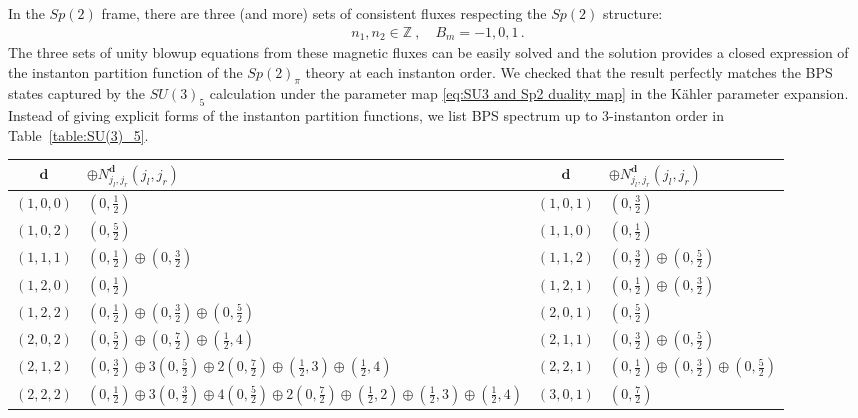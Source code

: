 In the $ Sp(2) $ frame, there are three (and more) sets of consistent fluxes respecting the $ Sp(2) $ structure:
\begin{align}
n_1,n_2 \in \mathbb{Z} \ , \quad B_m = -1, 0, 1 \, .
\end{align}
The three sets of unity blowup equations from these magnetic fluxes can be easily solved and the solution provides a closed expression of the instanton partition function of the $ Sp(2)_\pi $ theory at each instanton order. We checked that the result perfectly matches the BPS states captured by the $ SU(3)_5 $ calculation under the parameter map \eqref{eq:SU3 and Sp2 duality map} in the K\"ahler parameter expansion. Instead of giving explicit forms of  the instanton partition functions, we list BPS spectrum up to 3-instanton order in Table~\ref{table:SU(3)_5}.
\begin{table}
	\centering
	\begin{tabular}{|c|C{28ex}||c|C{28ex}|} \hline
		$ \mathbf{d} $ & $\oplus N_{j_l, j_r}^{\mathbf{d}} (j_l, j_r)$ & $ \mathbf{d} $ & $\oplus N_{j_l, j_r}^{\mathbf{d}} (j_l, j_r)$ \\ \hline
		$ (1, 0, 0) $ & $ (0, \frac{1}{2}) $ & $ (1, 0, 1) $ & $ (0, \frac{3}{2}) $ \\ \hline
		$ (1, 0, 2) $ & $ (0, \frac{5}{2}) $ & $ (1, 1, 0) $ & $ (0, \frac{1}{2}) $ \\ \hline
		$ (1, 1, 1) $ & $ (0, \frac{1}{2}) \oplus (0, \frac{3}{2}) $ & $ (1, 1, 2) $ & $ (0, \frac{3}{2}) \oplus (0, \frac{5}{2}) $ \\ \hline
		$ (1, 2, 0) $ & $ (0, \frac{1}{2}) $ & $ (1, 2, 1) $ & $ (0, \frac{1}{2}) \oplus (0, \frac{3}{2}) $ \\ \hline
		$ (1, 2, 2) $ & $ (0, \frac{1}{2}) \oplus (0, \frac{3}{2}) \oplus (0, \frac{5}{2}) $ & $ (2, 0, 1) $ & $ (0, \frac{5}{2}) $ \\ \hline
		$ (2, 0, 2) $ & $ (0, \frac{5}{2}) \oplus (0, \frac{7}{2}) \oplus (\frac{1}{2}, 4) $ & $ (2, 1, 1) $ & $ (0, \frac{3}{2}) \oplus (0, \frac{5}{2}) $ \\ \hline
		$ (2, 1, 2) $ & $ (0, \frac{3}{2}) \oplus 3(0, \frac{5}{2}) \oplus 2(0, \frac{7}{2}) \oplus (\frac{1}{2}, 3) \oplus (\frac{1}{2}, 4) $ & $ (2, 2, 1) $ & $ (0, \frac{1}{2}) \oplus (0, \frac{3}{2}) \oplus (0, \frac{5}{2}) $ \\ \hline
		$ (2, 2, 2) $ & $ (0, \frac{1}{2}) \oplus 3(0, \frac{3}{2}) \oplus 4(0, \frac{5}{2}) \oplus 2(0, \frac{7}{2}) \oplus (\frac{1}{2}, 2) \oplus (\frac{1}{2}, 3) \oplus (\frac{1}{2}, 4) $ & $ (3, 0, 1) $ & $ (0, \frac{7}{2}) $ \\ \hline

\end{tabular}
\end{table}
